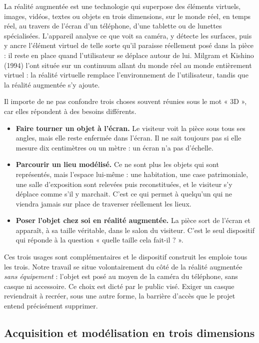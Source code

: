 La réalité augmentée est une technologie qui superpose des éléments virtuels,
images, vidéos, textes ou objets en trois dimensions, sur le monde réel, en
temps réel, au travers de l'écran d'un téléphone, d'une tablette ou de lunettes
spécialisées. L'appareil analyse ce que voit sa caméra, y détecte les surfaces,
puis y ancre l'élément virtuel de telle sorte qu'il paraisse réellement posé
dans la pièce : il reste en place quand l'utilisateur se déplace autour de lui.
Milgram et Kishino (1994) l'ont située sur un continuum allant du monde réel au
monde entièrement virtuel : la réalité virtuelle remplace l'environnement de
l'utilisateur, tandis que la réalité augmentée s'y ajoute.

Il importe de ne pas confondre trois choses souvent réunies sous le mot
« 3D », car elles répondent à des besoins différents.

\begin{itemize}
  \item \textbf{Faire tourner un objet à l'écran.} Le visiteur voit la pièce
        sous tous ses angles, mais elle reste enfermée dans l'écran. Il ne sait
        toujours pas si elle mesure dix centimètres ou un mètre : un écran n'a
        pas d'échelle.
  \item \textbf{Parcourir un lieu modélisé.} Ce ne sont plus les objets qui
        sont représentés, mais l'espace lui-même : une habitation, une case
        patrimoniale, une salle d'exposition sont relevées puis reconstituées,
        et le visiteur s'y déplace comme s'il y marchait. C'est ce qui permet à
        quelqu'un qui ne viendra jamais sur place de traverser réellement les
        lieux.
  \item \textbf{Poser l'objet chez soi en réalité augmentée.} La pièce sort de
        l'écran et apparaît, à sa taille véritable, dans le salon du visiteur.
        C'est le seul dispositif qui réponde à la question « quelle taille cela
        fait-il ? ».
\end{itemize}

Ces trois usages sont complémentaires et le dispositif construit les emploie
tous les trois. Notre travail se situe volontairement du côté de la réalité
augmentée \emph{sans équipement} : l'objet est posé au moyen de la caméra du
téléphone, sans casque ni accessoire. Ce choix est dicté par le public visé.
Exiger un casque reviendrait à recréer, sous une autre forme, la barrière
d'accès que le projet entend précisément supprimer.

\subsection{Acquisition et modélisation en trois dimensions}


